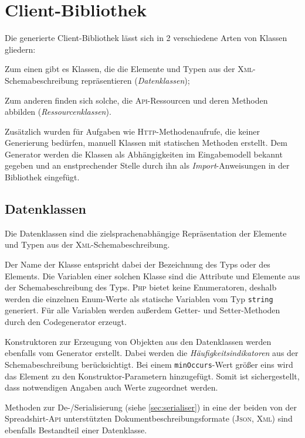 \section{Client-Bibliothek}
\label{sec:client_library}

Die generierte Client-Bibliothek lässt sich in 2 verschiedene Arten von Klassen gliedern:
\begin{compactitem}
    \item[] Zum einen gibt es Klassen, die die Elemente und Typen aus der \textsc{Xml}-Schemabeschreibung repräsentieren (\emph{Datenklassen});
    \item[] Zum anderen finden sich solche, die \textsc{Api}-Ressourcen und deren Methoden abbilden (\emph{Ressourcenklassen}).
\end{compactitem}

Zusätzlich wurden für Aufgaben wie \textsc{Http}-Methodenaufrufe, die keiner Generierung bedürfen, manuell Klassen mit statischen Methoden erstellt. Dem Generator werden die Klassen als Abhängigkeiten im Eingabemodell bekannt gegeben und an enstprechender Stelle durch ihn als \emph{Import}-Anweisungen in der Bibliothek eingefügt.

\subsection{Datenklassen}
\label{sec:dataclasses}

Die Datenklassen sind die zielsprachenabhängige Repräsentation der Elemente und Typen aus der \textsc{Xml}-Schemabeschreibung. 

Der Name der Klasse entspricht dabei der Bezeichnung des Typs oder des Elements. Die Variablen einer solchen Klasse sind die Attribute und Elemente aus der Schemabeschreibung des Typs. \textsc{Php} bietet keine Enumeratoren, deshalb werden die einzelnen Enum-Werte als statische Variablen vom Typ \texttt{string} generiert. Für alle Variablen werden außerdem Getter- und Setter-Methoden durch den Codegenerator erzeugt.

Konstruktoren zur Erzeugung von Objekten aus den Datenklassen werden ebenfalls vom Generator erstellt. Dabei werden die \emph{Häufigkeitsindikatoren} aus der Schemabeschreibung berücksichtigt. Bei einem \texttt{minOccurs}-Wert größer eins wird das Element zu den Konstruktor-Parametern hinzugefügt. Somit ist sichergestellt, dass notwendigen Angaben auch Werte zugeordnet werden.

Methoden zur De-/Serialisierung (siehe \cref{sec:serialiser}) in eine der beiden von der Spreadshirt-\textsc{Api} unterstützten Dokumentbeschreibungsformate (\textsc{Json}, \textsc{Xml}) sind ebenfalls Bestandteil einer Datenklasse.

